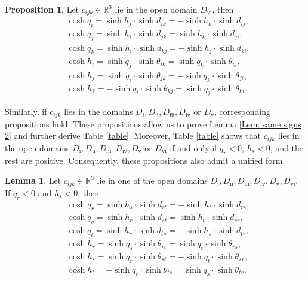 \documentclass[12pt]{amsart}
\theoremstyle{definition}
\newtheorem{lemma}[theorem]{Lemma}
\newtheorem{proposition}[theorem]{Proposition}
\begin{document}
\begin{proposition}\label{Prop: space-like 2}
Let $c_{ijk}\in \mathbb{R}^3$ lie in the open domain $D_\mathrm{vi}$, then
\begin{equation*}
\begin{aligned}
&\cosh q_i=\sinh h_j\cdot\sinh d_{ik}
=-\sinh h_k\cdot\sinh d_{ij},\\
&\cosh q_j=\sinh h_i\cdot\sinh d_{jk}
=\sinh h_k\cdot\sinh d_{ji},\\
&\cosh q_k=\sinh h_i\cdot\sinh d_{kj}
=-\sinh h_j\cdot\sinh d_{ki},\\
&\cosh h_i=\sinh q_j\cdot\sinh \theta_{ik}
=\sinh q_k\cdot\sinh \theta_{ij},\\
&\cosh h_j=\sinh q_i\cdot\sinh \theta_{jk}
=-\sinh q_k\cdot\sinh \theta_{ji},\\
&\cosh h_k=-\sinh q_i\cdot\sinh \theta_{kj}
=\sinh q_j\cdot\sinh \theta_{ki}.
\end{aligned}
\end{equation*}
\end{proposition}

Similarly, if $c_{ijk}$ lies in the domains $D_\mathrm{i}, D_\mathrm{ii}, D_\mathrm{iii}, D_\mathrm{iv}$ or $D_\mathrm{v}$, 
corresponding propositions hold.
These propositions allow us to prove Lemma \ref{Lem: same signs 2} and further derive Table \ref{table}. 
Moreover, Table \ref{table} shows that $c_{ijk}$ lies in the open domains $D_\mathrm{i}, D_\mathrm{ii}, D_\mathrm{iii}, D_\mathrm{iv}, D_\mathrm{v}$ or $D_\mathrm{vi}$ if and only if $q_r<0$, $h_s<0$, and the rest are positive.
Consequently, these propositions also admit a unified form.

\begin{lemma}\label{Lem: space-like 2}
Let $c_{ijk}\in \mathbb{R}^3$ lie in one of the open domains $D_\mathrm{i}, D_\mathrm{ii}, D_\mathrm{iii}, D_\mathrm{iv}, D_\mathrm{v}, D_\mathrm{vi}$.
If $q_r<0$ and $h_s<0$, then
\begin{equation*}
\begin{aligned}
&\cosh q_r=\sinh h_s\cdot\sinh d_{rt}=-\sinh h_t\cdot\sinh d_{rs},\\
&\cosh q_s=\sinh h_r\cdot\sinh d_{st}=\sinh h_t\cdot\sinh d_{sr},\\
&\cosh q_t=\sinh h_r\cdot\sinh d_{ts}=-\sinh h_s\cdot\sinh d_{tr},\\
&\cosh h_r=\sinh q_s\cdot\sinh \theta_{rt}=\sinh q_t\cdot\sinh \theta_{rs},\\
&\cosh h_s=\sinh q_r\cdot\sinh \theta_{st}=-\sinh q_t\cdot\sinh \theta_{sr},\\
&\cosh h_t=-\sinh q_r\cdot\sinh \theta_{ts}=\sinh q_s\cdot\sinh \theta_{tr}.
\end{aligned}
\end{equation*}
\end{lemma}
\end{document}
